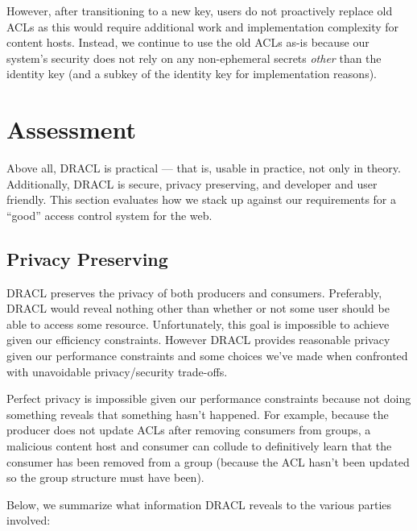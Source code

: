 \documentclass[pdftex,12pt,a4papaer,twoside,notitlepage]{report}
\begin{document}
However, after transitioning to a new key, users do not proactively replace old
ACLs as this would require additional work and implementation complexity for
content hosts. Instead, we continue to use the old ACLs as-is because our
system's security does not rely on any non-ephemeral secrets \emph{other} than
the identity key (and a subkey of the identity key for implementation reasons).

\chapter{Assessment}

Above all, DRACL is practical --- that is, usable in practice, not only in
theory. Additionally, DRACL is secure, privacy preserving, and developer and
user friendly. This section evaluates how we stack up against our requirements
for a ``good'' access control system for the web.

\section{Privacy Preserving}
\label{sec:privacy}

DRACL preserves the privacy of both producers and consumers. Preferably, DRACL
would reveal nothing other than whether or not some user should be able to
access some resource. Unfortunately, this goal is impossible to achieve given
our efficiency constraints. However DRACL provides reasonable privacy given our
performance constraints and some choices we've made when confronted with
unavoidable privacy/security trade-offs.

Perfect privacy is impossible given our performance constraints because not
doing something reveals that something hasn't happened. For example, because the
producer does not update ACLs after removing consumers from groups, a malicious
content host and consumer can collude to definitively learn that the consumer
has been removed from a group (because the ACL hasn't been updated so the group
structure must have been).

Below, we summarize what information DRACL reveals to the various parties involved:
\end{document}
